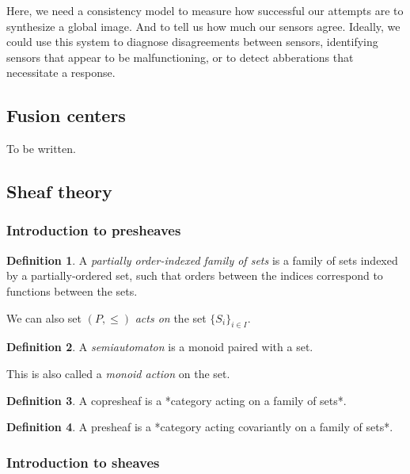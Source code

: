 \documentclass[]             %
{NASA}                       %
\theoremstyle{definition}
\newtheorem{definition}{Definition}[section]
\begin{document}
Here, we need a consistency model to measure how successful our attempts
are to synthesize a global image. And to tell us how much our sensors
agree. Ideally, we could use this system to diagnose disagreements
between sensors, identifying sensors that appear to be malfunctioning,
or to detect abberations that necessitate a response.

\hypertarget{fusion-centers}{%
\subsection{Fusion centers}\label{fusion-centers}}

To be written.

\hypertarget{sheaf-theory}{%
\subsection{Sheaf theory}\label{sheaf-theory}}

\hypertarget{introduction-to-presheaves}{%
\subsubsection{Introduction to
presheaves}\label{introduction-to-presheaves}}

\begin{definition}
A \emph{partially order-indexed family of sets} is a family of sets indexed by a partially-ordered set,
such that orders between the indices correspond to functions between the sets.
\end{definition}

We can also set \((P, \leq)\) \emph{acts on} the set
\(\{S_i\}_{i \in I}\).

\begin{definition}
A \emph{semiautomaton} is a monoid paired with a set.
\end{definition}

This is also called a \emph{monoid action} on the set.

\begin{definition}
A copresheaf is a *category acting on a family of sets*.
\end{definition}

\begin{definition}
A presheaf is a *category acting covariantly on a family of sets*.
\end{definition}

\hypertarget{introduction-to-sheaves}{%
\subsubsection{Introduction to sheaves}\label{introduction-to-sheaves}}
\end{document}
